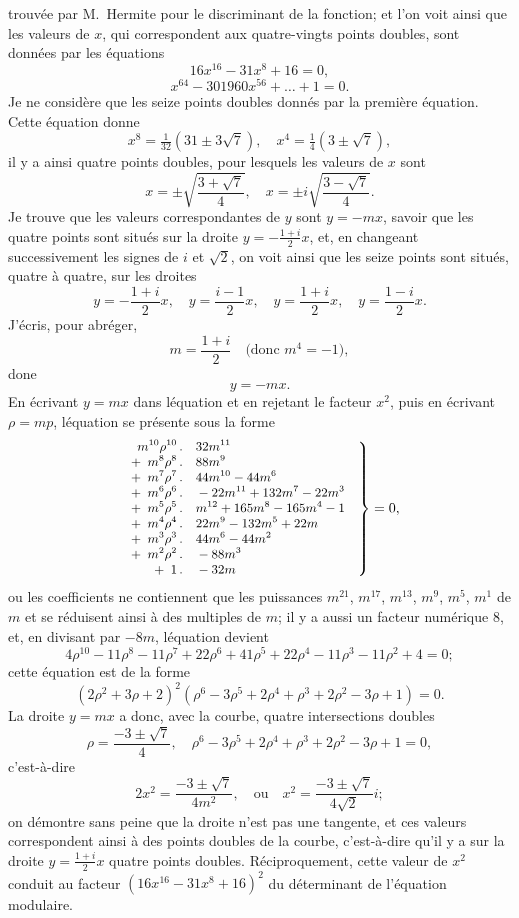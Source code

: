 \documentclass[11pt,a4paper]{book}
\begin{document}
trouv\'ee par M.\ Hermite pour le discriminant de la fonction; et l'on voit ainsi que les valeurs de $x$, qui correspondent aux quatre-vingts points doubles, sont donn\'ees par les \'equations
$$
16x^{16} - 31x^8 + 16 = 0,
$$
$$
x^{64} - 301960x^{56} + \ldots + 1 = 0.
$$
Je ne consid\`ere que les seize points doubles donn\'es par la premi\`ere \'equation. Cette \'equation donne
$$
x^8 = \tfrac{1}{32}(31 \pm 3\sqrt{7}), \quad x^4 = \tfrac{1}{4}(3 \pm \sqrt{7}),
$$
il y a ainsi quatre points doubles, pour lesquels les valeurs de $x$ sont
$$
x = \pm\sqrt{\frac{3 + \sqrt{7}}{4}}, \quad x = \pm i\sqrt{\frac{3 - \sqrt{7}}{4}}.
$$
Je trouve que les valeurs correspondantes de $y$ sont $y = -mx$, savoir que les quatre points sont situ\'es sur la droite $y = -\frac{1+i}{2}x$, et, en changeant successivement les signes de $i$ et $\sqrt{2}$, on voit ainsi que les seize points sont situ\'es, quatre \`a quatre, sur les droites
$$
y = -\frac{1+i}{2}x, \quad y = \frac{i-1}{2}x, \quad y = \frac{1+i}{2}x, \quad y = \frac{1-i}{2}x.
$$
J'\'ecris, pour abr\'eger,
$$
m = \frac{1+i}{2} \quad \text{(donc } m^4 = -1 \text{)},
$$
done
$$
y = -mx.
$$
En \'ecrivant $y = mx$ dans l\'equation et en rejetant le facteur $x^2$, puis en \'ecrivant $\rho = mp$, l\'equation se pr\'esente sous la forme
$$\small
\left.\begin{array}{r@{\,}l@{\quad}r}
m^{10}\rho^{10} & .\quad 32m^{11} \\
{}+\; m^{8}\rho^{8} & .\quad 88m^{9} \\
{}+\; m^{7}\rho^{7} & .\quad 44m^{10} - 44m^{6} \\
{}+\; m^{6}\rho^{6} & .\quad -22m^{11} + 132m^{7} - 22m^{3} \\
{}+\; m^{5}\rho^{5} & .\quad m^{12} + 165m^{8} - 165m^{4} - 1 \\
{}+\; m^{4}\rho^{4} & .\quad 22m^{9} - 132m^{5} + 22m \\
{}+\; m^{3}\rho^{3} & .\quad 44m^{6} - 44m^{2} \\
{}+\; m^{2}\rho^{2} & .\quad -88m^{3} \\
{}+\; 1 & .\quad -32m
\end{array}\right\} = 0,
$$
ou les coefficients ne contiennent que les puissances $m^{21}$, $m^{17}$, $m^{13}$, $m^9$, $m^5$, $m^1$ de $m$ et se r\'eduisent ainsi \`a des multiples de $m$; il y a aussi un facteur num\'erique 8, et, en divisant par $-8m$, l\'equation devient
$$4\rho^{10} - 11\rho^8 - 11\rho^7 + 22\rho^6 + 41\rho^5 + 22\rho^4 - 11\rho^3 - 11\rho^2 + 4 = 0;$$
cette \'equation est de la forme
$$
(2\rho^2 + 3\rho + 2)^2(\rho^6 - 3\rho^5 + 2\rho^4 + \rho^3 + 2\rho^2 - 3\rho + 1) = 0.
$$
La droite $y = mx$ a donc, avec la courbe, quatre intersections doubles
$$
\rho = \frac{-3 \pm \sqrt{7}}{4}, \quad \rho^6 - 3\rho^5 + 2\rho^4 + \rho^3 + 2\rho^2 - 3\rho + 1 = 0,
$$
c'est-\`a-dire
$$
2x^2 = \frac{-3 \pm \sqrt{7}}{4m^2}, \quad \text{ou} \quad x^2 = \frac{-3 \pm \sqrt{7}}{4\sqrt{2}}i;
$$
on d\'emontre sans peine que la droite n'est pas une tangente, et ces valeurs correspondent ainsi \`a des points doubles de la courbe, c'est-\`a-dire qu'il y a sur la droite $y = \frac{1+i}{2}x$ quatre points doubles. R\'eciproquement, cette valeur de $x^2$ conduit au facteur $(16x^{16} - 31x^8 + 16)^2$ du d\'eterminant de l'\'equation modulaire.
\end{document}

